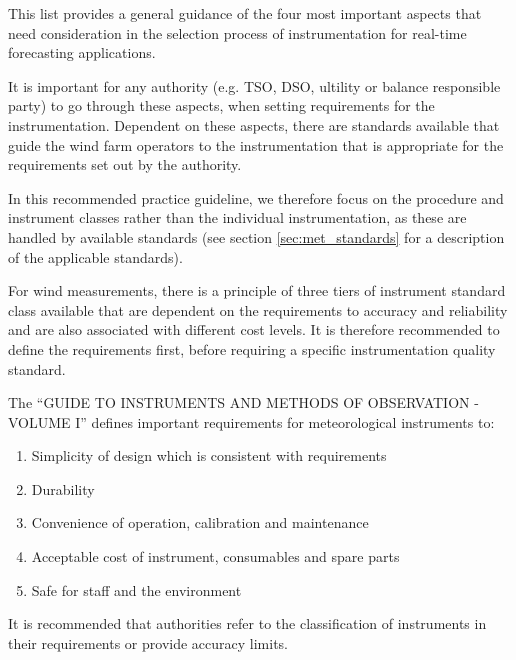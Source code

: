 This list provides a general guidance of the four most important aspects that need consideration in the selection process of instrumentation for real-time forecasting applications. 

It is important for any authority (e.g. TSO, DSO, ultility or balance responsible party) to go through these aspects, when setting requirements for the instrumentation. Dependent on these aspects, there are standards available that guide the wind farm operators to the instrumentation that is appropriate for the requirements set out by the authority. 

In this recommended practice guideline, we therefore focus on the procedure and instrument classes rather than the individual instrumentation, as these are handled by available standards (see section \ref{sec:met_standards} for a description of the applicable standards). 

For wind measurements, there is a principle of three tiers of instrument standard class available that are dependent on the requirements to accuracy and reliability and are also associated with different cost levels. It is therefore recommended to define the requirements first, before requiring a specific instrumentation quality standard. 

The ``GUIDE TO INSTRUMENTS AND METHODS OF OBSERVATION - VOLUME I''\cite{wmoguide2018} defines important requirements for meteorological instruments to:

\begin{enumerate}
    \vspace{-0.2cm}\item Simplicity of design which is consistent with requirements
    \vspace{-0.4cm}\item Durability
    \vspace{-0.4cm}\item Convenience of operation, calibration and maintenance
    \vspace{-0.4cm}\item Acceptable cost of instrument, consumables and spare parts
    \vspace{-0.4cm}\item Safe for staff and the environment
\end{enumerate}

It is recommended that authorities refer to the classification of  instruments in their requirements or provide accuracy limits. 

